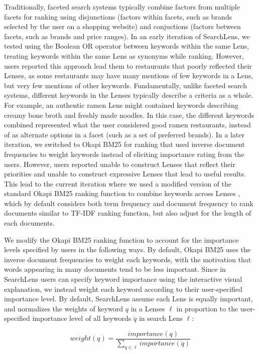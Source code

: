 \documentclass{sigchi}
\begin{document}
Traditionally, faceted search systems typically combine factors from multiple facets for ranking using disjunctions (factors within facets, such as brands selected by the user on a shopping website) and conjuctions (factors between facets, such as brands and price ranges). In an early iteration of SearchLens, we tested using the Boolean OR operator between keywords within the same Lens, treating keywords within the same Lens as synonyms while ranking. However, users reported this approach lead them to restaurants that poorly reflected their Lenses, as some restaurants may have many mentions of few keywords in a Lens, but very few mentions of other keywords. Fundamentally, unlike faceted search systems, different keywords in the Lenses typically describe a criteria as a whole. For example, an authentic ramen Lens might contained keywords describing creamy bone broth and freshly made noodles. In this case, the different keywords combined represented what the user considered good ramen restaurants, instead of as alternate options in a facet (such as a set of preferred brands). In a later iteration, we switched to Okapi BM25 for ranking that used inverse document frequencies to weight keywords instead of eliciting importance rating from the users. However, users reported unable to construct Lenses that reflect their priorities and unable to construct expressive Lenses that lead to useful results. This lead to the current iteration where we used a modified version of the standard Okapi BM25 ranking function to combine keywords across Lenses \cite{robertson2009probabilistic}, which by default considers both term frequency and document frequency to rank documents similar to TF-IDF ranking function, but also adjust for the length of each documents.

We modify the Okapi BM25 ranking function to account for the importance levels specified by users in the following ways. By default, Okapi BM25 uses the inverse document frequencies to weight each keywords, with the motivation that words appearing in many documents tend to be less important. Since in SearchLens users can specify keyword importance using the interactive visual explanation, we instead weight each keyword according to their user-specified importance level. By default, SearchLens assume each Lens is equally important, and normalizes the weights of keyword $q$ in a Lenses $\ell$ in proportion to the user-specified importance level of all keywords $\acute{q}$ in search Lens $\ell$:

$$weight(q) = \frac{importance(q)}{
    \sum_{\acute{q} \in \ell}{importance(\acute{q})}
}$$
\end{document}

